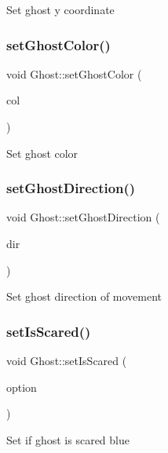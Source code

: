 Set ghost y coordinate \mbox{\label{class_ghost_a16d120b99cd6a6c7f47ec067a09ef74b}} 
\subsubsection{\texorpdfstring{set\+Ghost\+Color()}{setGhostColor()}}
{\footnotesize\ttfamily void Ghost\+::set\+Ghost\+Color (\begin{DoxyParamCaption}\item[{Q\+String}]{col }\end{DoxyParamCaption})}

Set ghost color \mbox{\label{class_ghost_a021a76713a5fdf501fd601d8644002bb}} 
\subsubsection{\texorpdfstring{set\+Ghost\+Direction()}{setGhostDirection()}}
{\footnotesize\ttfamily void Ghost\+::set\+Ghost\+Direction (\begin{DoxyParamCaption}\item[{int}]{dir }\end{DoxyParamCaption})\hspace{0.3cm}{\ttfamily [inline]}}

Set ghost direction of movement \mbox{\label{class_ghost_a6e6f3e5ff87c2c9efeb58c188530f431}} 
\subsubsection{\texorpdfstring{set\+Is\+Scared()}{setIsScared()}}
{\footnotesize\ttfamily void Ghost\+::set\+Is\+Scared (\begin{DoxyParamCaption}\item[{bool}]{option }\end{DoxyParamCaption})\hspace{0.3cm}{\ttfamily [inline]}}

Set if ghost is scared blue \mbox{\label{class_ghost_a22197187d8c42a2a2d2f0facdda54356}} 
